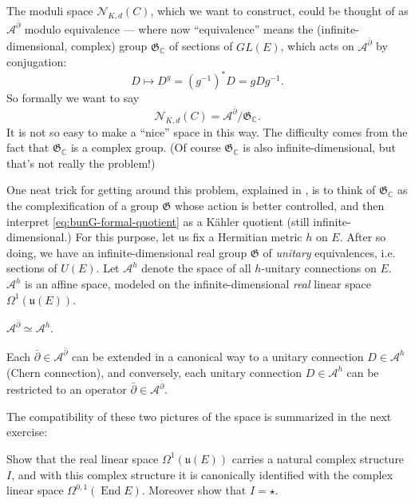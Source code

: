 \documentclass[12pt,letterpaper,reqno]{article}
\numberwithin{equation}{section}
\newcommand{\fu}{{\mathfrak u}}
\newcommand{\fG}{{\mathfrak G}}
\newcommand{\cN}{\ensuremath{\mathcal N}}
\newcommand{\cA}{\ensuremath{\mathcal A}}
\newcommand{\C}{\ensuremath{\mathbb C}}
\newcommand{\kahler}{K\"ahler\xspace}
\newcommand{\ti}[1]{\textit{#1}}
\DeclareMathOperator{\End}{End}
\begin{document}
The moduli space $\cN_{K,d}(C)$, which we want to construct, 
could be thought of as
$\cA^{\bar\partial}$ modulo equivalence --- where now ``equivalence'' means
the (infinite-dimensional,
complex) group $\fG_\C$ of sections of $GL(E)$,
which acts on $\cA^{\bar\partial}$ by conjugation:
\begin{equation}
  D \mapsto D^g = (g^{-1})^* D = g D g^{-1}.  
\end{equation}
So formally we want to say
\begin{equation} \label{eq:bunG-formal-quotient}
  \cN_{K,d}(C) = \cA^{\bar\partial} / \fG_\C.
\end{equation}
It is not so easy to make a ``nice'' space in this way.
The difficulty comes from the 
fact that $\fG_\C$ is a complex group.
(Of course $\fG_\C$ is also infinite-dimensional,
but that's not really the problem!)

One neat trick for getting around this problem, 
explained in \cite{MR85k:14006}, 
is to think of $\fG_\C$ as the complexification of a
group $\fG$ whose action is better controlled, and 
then interpret \eqref{eq:bunG-formal-quotient}
as a \kahler quotient (still infinite-dimensional.)
For this purpose, let us fix a Hermitian metric $h$ on $E$.
After so doing, we have an infinite-dimensional real group
$\fG$ of \ti{unitary} equivalences, i.e. sections of $U(E)$.
Let $\cA^h$ denote the space of all $h$-unitary connections
on $E$.
$\cA^h$ is an affine space, modeled
on the infinite-dimensional \ti{real} linear space $\Omega^{1}(\fu(E))$.

\begin{prop}[Unitary connections = holomorphic structures] 
$\cA^{\bar\partial} \simeq \cA^h$.
\end{prop}
\begin{pf} Each $\bar\partial \in \cA^{\bar\partial}$
can be extended in a canonical way to a unitary connection $D \in \cA^h$
(Chern connection), and conversely, each unitary connection $D \in \cA^h$ 
can be restricted to an operator $\bar\partial \in \cA^{\bar\partial}$.
\end{pf}

The compatibility of these two pictures of the space 
is summarized in the next exercise:

\begin{exercise} Show that the real linear space 
$\Omega^{1}(\fu(E))$ carries a natural complex structure $I$,
and with this complex structure it is canonically identified
with the complex linear space $\Omega^{0,1}(\End E)$.
Moreover show that $I = \star$.
\end{exercise}
\end{document}
